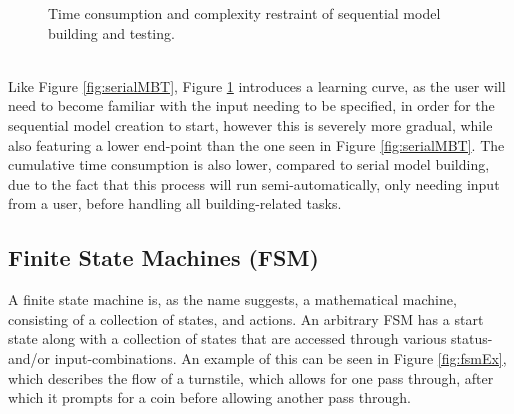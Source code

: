 \begin{description}
\begin{figure}[h]
		\caption{Time consumption and complexity restraint of sequential model building and testing.}
		\label{fig:sequenceMBT}
	\end{figure}\\
	Like Figure \ref{fig:serialMBT}, Figure \ref{fig:sequenceMBT} introduces a learning curve, as the user will need to become familiar with the input needing to be specified, in order for the sequential model creation to start, however this is severely more gradual, while also featuring a lower end-point than the one seen in Figure \ref{fig:serialMBT}. The cumulative time consumption is also lower, compared to serial model building, due to the fact that this process will run semi-automatically, only needing input from a user, before handling all building-related tasks.
\end{description}
\newpage
\subsection{Finite State Machines (FSM)}
A finite state machine is, as the name suggests, a mathematical machine, consisting of a collection of states, and actions. An arbitrary FSM has a start state along with a collection of states that are accessed through various status- and/or input-combinations. An example of this can be seen in Figure \ref{fig:fsmEx}, which describes the flow of a turnstile, which allows for one pass through, after which it prompts for a coin before allowing another pass through.


